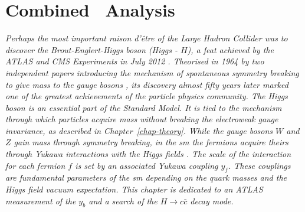\chapter[\color{oxfordblue} Combined \boldvhbc\ Analysis]{\color{oxfordblue} Combined \vhbc\ Analysis}\label{chap-VH}
\ChapFrame

\textit{Perhaps the most important \textit{raison d'être} of the \textit{Large Hadron Collider} was to discover the Brout-Englert-Higgs boson (Higgs - $H$), a feat achieved by the ATLAS and CMS Experiments in July 2012 \cite{ATLAS:2012yve, CMS:2012qbp}. Theorised in 1964 by two independent papers introducing the mechanism of spontaneous symmetry breaking to give mass to the gauge bosons \cite{Englert:1964et,  PhysRevLett.13.508}, its discovery almost fifty years later marked one of the greatest achievements of the particle physics community. The Higgs boson is an essential part of the Standard Model. It is tied to the mechanism through which particles acquire mass without breaking the electroweak gauge invariance, as described in Chapter~\ref{chap-theory}. While the gauge bosons $W$ and $Z$ gain mass through symmetry breaking, in the \gls{sm} the fermions acquire theirs through Yukawa interactions with the Higgs fields \cite{10.1143/PTPS.1.1}. The scale of the interaction for each fermion $f$ is set by an associated Yukawa coupling $y_f$. These couplings are fundamental parameters of the \gls{sm} depending on the quark masses and the Higgs field vacuum expectation. This chapter is dedicated to an ATLAS measurement of the $y_b$ and a search of the $H \rightarrow c\bar{c}$ decay mode.}

